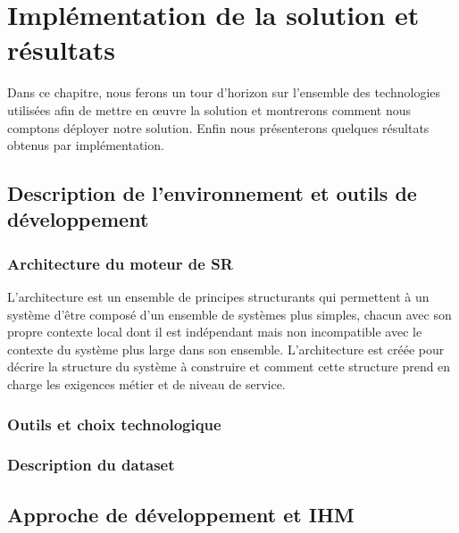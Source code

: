 \chapter{Implémentation de la solution et résultats}

Dans ce chapitre, nous ferons un tour d’horizon sur l’ensemble des technologies utilisées afin de mettre en œuvre la solution et montrerons comment nous comptons déployer notre solution. Enfin nous présenterons quelques résultats obtenus par implémentation.

\section{Description de l’environnement et outils de développement}

\subsection{Architecture du moteur de SR}
	L'architecture est un ensemble de principes structurants qui permettent à un système d'être composé d'un ensemble de systèmes plus simples, chacun avec son propre contexte local dont il est indépendant mais non incompatible avec le contexte du système plus large dans son ensemble. L'architecture est créée pour décrire la structure du système à construire et comment cette structure prend en charge les exigences métier et de niveau de service. \\
	
\subsection{Outils et choix technologique}

\subsection{Description du dataset }


\section{Approche de développement et IHM}
